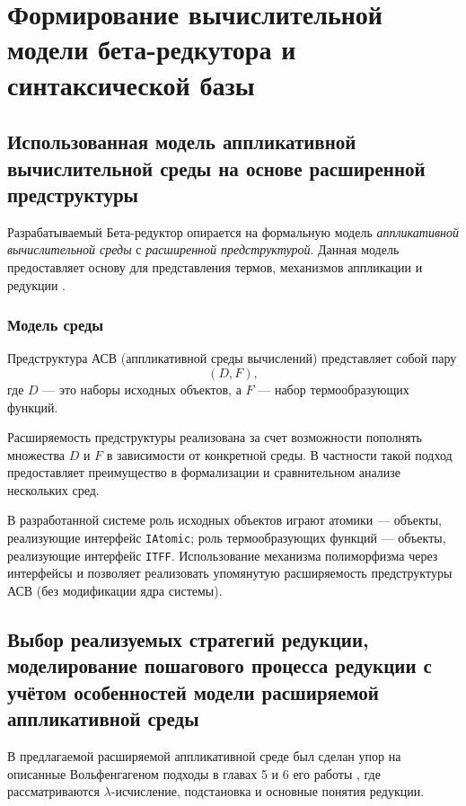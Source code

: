 \chapter{Формирование вычислительной модели бета-редкутора и синтаксической базы}
\section{Использованная модель аппликативной вычислительной среды на основе расширенной предструктуры}
\label{sec:extended-prestructure}

Разрабатываемый Бета-редуктор опирается на формальную модель \textit{аппликативной вычислительной среды} с \emph{расширенной предструктурой}.
Данная модель предоставляет основу для представления термов, механизмов аппликации и редукции \cite{Roslovtsev2011}.

\subsection*{Модель среды}
Предструктура АСВ (аппликативной среды вычислений) представляет собой пару 
$$ (D, F), $$
где $D$ --- это наборы исходных объектов, а $F$ --- набор термообразующих функций.

Расширяемость предструктуры реализована за счет возможности пополнять множества $D$ и $F$
в зависимости от конкретной среды.
В частности такой подход предоставляет преимущество в формализации и сравнительном анализе нескольких сред.

В разработанной системе роль исходных объектов играют атомики --- объекты, реализующие интерфейс \texttt{IAtomic};
роль термообразующих функций --- объекты, реализующие интерфейс \texttt{ITFF}.
Использование механизма полиморфизма через интерфейсы и позволяет реализовать упомянутую расширяемость предструктуры АСВ
(без модификации ядра системы).

\section{Выбор реализуемых стратегий редукции, моделирование пошагового процесса редукции с учётом особенностей модели расширяемой аппликативной среды}
\label{sec:reduction-strategies}

В предлагаемой расширяемой аппликативной среде был сделан упор на описанные Вольфенгагеном подходы в главах 5 и 6 его работы \cite{Wolfengagen2004}, где рассматриваются $\lambda$-исчисление, подстановка и основные понятия редукции.

